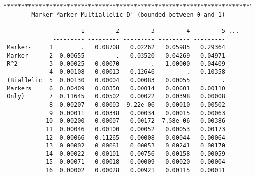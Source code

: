 \begin{verbatim}
**********************************************************************************
        Marker-Marker Multiallelic D' (bounded between 0 and 1)

                      1         2         3         4         5 ...
              --------- --------- --------- --------- ---------
 Marker-     1        .   0.08708   0.02262   0.05985   0.29364 
 Marker      2  0.00655         .   0.03520   0.04269   0.04971 
 R^2         3  0.00025   0.00070         .   1.00000   0.04409 
             4  0.00108   0.00013   0.12646         .   0.10358 
 (Biallelic  5  0.00130   0.00004   0.00083   0.00055         . 
 Markers     6  0.00409   0.00350   0.00014   0.00601   0.00110 
 Only)       7  0.11645   0.00502   0.00022   0.00398   0.00008 
             8  0.00207   0.00003  9.22e-06   0.00010   0.00502 
             9  0.00011   0.00348   0.00034   0.00015   0.00063 
            10  0.00200   0.00007   0.00172  7.58e-06   0.00386 
            11  0.00046   0.00100   0.00052   0.00053   0.00173 
            12  0.00066   0.11265   0.00008   0.00044   0.00064 
            13  0.00002   0.00061   0.00053   0.00241   0.00170 
            14  0.00022   0.00101   0.00756   0.00158   0.00059 
            15  0.00071   0.00018   0.00009   0.00020   0.00004 
            16  0.00002   0.00028   0.00921   0.00115   0.00011
\end{verbatim}

